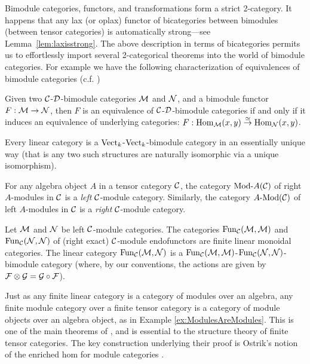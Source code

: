 \documentclass{amsart}
\begin{document}
%
\nid Bimodule categories, functors, and transformations form a strict 2-category.  %
It happens that any lax (or oplax) functor of bicategories between bimodules (between tensor categories) is automatically strong---see Lemma~\ref{lem:laxisstrong}. The above description in terms of bicategories permits us to effortlessly import several 2-categorical theorems into the world of bimodule categories. For example we have the following characterization of equivalences of bimodule categories (c.f. \cite{MR2664622})

\begin{lemma} \label{lem:Recog_equiv_of_bimod}
	Given two $\mathcal C$-$\mathcal D$-bimodule categories $\mathcal M$ and $\mathcal N$, and a bimodule functor $F:\mathcal M \to \mathcal N$, then $F$ is an equivalence of $\mathcal C$-$\mathcal D$-bimodule categories if and only if it induces an equivalence of underlying categories: $F: \operatorname{Hom}_{\mathcal M}(x,y) \stackrel{\simeq}{\to} \operatorname{Hom}_{\mathcal N}(x,y)$. 
\end{lemma}


\begin{example}
	Every linear category is a $\mathrm{Vect}_k$-$\mathrm{Vect}_k$-bimodule category in an essentially unique way (that is any two such structures are naturally isomorphic via a unique isomorphism). %
\end{example}

\begin{example} \label{ex:ModulesAreModules}
	For any algebra object $A$ in a tensor category $\mathcal C$, the category $\Mod{}{A}(\cC)$ of right $A$-modules in $\mathcal C$ is a \emph{left} $\mathcal C$-module category.  Similarly, the category $\Mod{A}{}(\cC)$ of left $A$-modules in $\mathcal C$ is a \emph{right} $\mathcal C$-module category.
\end{example}

\begin{example}
	Let $\mathcal M$ and $\mathcal N$ be left $\mathcal C$-module categories. The categories $\operatorname{Fun}_{\mathcal C}(\mathcal M, \mathcal M)$ and $\operatorname{Fun}_{\mathcal C}(\mathcal N, \mathcal N)$ of (right exact) $\mathcal C$-module endofunctors are finite linear monoidal categories. The linear category $\operatorname{Fun}_{\mathcal C}(\mathcal M, \mathcal N)$ is a $\operatorname{Fun}_{\mathcal C}(\mathcal M, \mathcal M)$-$\operatorname{Fun}_{\mathcal C}(\mathcal N, \mathcal N)$-bimodule category (where, by our conventions, the actions are given by $\mathcal F \otimes \mathcal G = \mathcal G \circ \mathcal F$). 
\end{example}

Just as any finite linear category is a category of modules over an algebra, any finite module category over a finite tensor category is a category of module objects over an algebra object, as in Example \ref{ex:ModulesAreModules}.  This is one of the main theorems of \cite{EGNO}, and is essential to the structure theory of finite tensor categories.  The key construction underlying their proof is Ostrik's notion of the enriched hom for module categories \cite{MR1976459}.  
\end{document}
